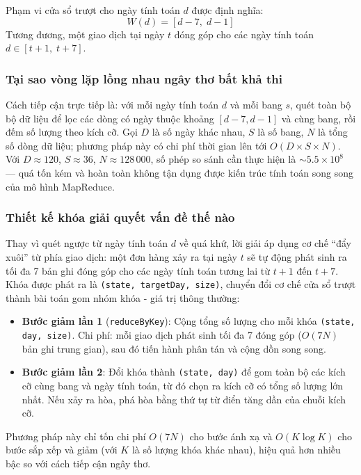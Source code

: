 Phạm vi cửa sổ trượt cho ngày tính toán $d$ được định nghĩa:
\[
W(d) = [d - 7,\; d - 1]
\]
Tương đương, một giao dịch tại ngày $t$ đóng góp cho các ngày tính toán $d \in [t+1,\; t+7]$.

\subsubsection{Tại sao vòng lặp lồng nhau ngây thơ bất khả thi}

Cách tiếp cận trực tiếp là: với mỗi ngày tính toán $d$ và mỗi bang $s$, quét toàn bộ bộ dữ liệu để lọc các dòng có ngày thuộc khoảng $[d-7, d-1]$ và cùng bang, rồi đếm số lượng theo kích cỡ. Gọi $D$ là số ngày khác nhau, $S$ là số bang, $N$ là tổng số dòng dữ liệu; phương pháp này có chi phí thời gian lên tới $O(D \times S \times N)$. Với $D \approx 120$, $S \approx 36$, $N \approx 128\,000$, số phép so sánh cần thực hiện là $\sim 5.5 \times 10^8$ --- quá tốn kém và hoàn toàn không tận dụng được kiến trúc tính toán song song của mô hình MapReduce.

\subsubsection{Thiết kế khóa giải quyết vấn đề thế nào}

Thay vì quét ngược từ ngày tính toán $d$ về quá khứ, lời giải áp dụng cơ chế ``đẩy xuôi'' từ phía giao dịch: một đơn hàng xảy ra tại ngày $t$ sẽ tự động phát sinh ra tối đa 7 bản ghi đóng góp cho các ngày tính toán tương lai từ $t+1$ đến $t+7$. Khóa được phát ra là \texttt{(state, targetDay, size)}, chuyển đổi cơ chế cửa sổ trượt thành bài toán gom nhóm khóa - giá trị thông thường:

\begin{itemize}
    \item \textbf{Bước giảm lần 1} (\texttt{reduceByKey}): Cộng tổng số lượng cho mỗi khóa \texttt{(state, day, size)}. Chi phí: mỗi giao dịch phát sinh tối đa 7 đóng góp ($O(7N)$ bản ghi trung gian), sau đó tiến hành phân tán và cộng dồn song song.
    \item \textbf{Bước giảm lần 2}: Đổi khóa thành \texttt{(state, day)} để gom toàn bộ các kích cỡ cùng bang và ngày tính toán, từ đó chọn ra kích cỡ có tổng số lượng lớn nhất. Nếu xảy ra hòa, phá hòa bằng thứ tự từ điển tăng dần của chuỗi kích cỡ.
\end{itemize}

Phương pháp này chỉ tốn chi phí $O(7N)$ cho bước ánh xạ và $O(K \log K)$ cho bước sắp xếp và giảm (với $K$ là số lượng khóa khác nhau), hiệu quả hơn nhiều bậc so với cách tiếp cận ngây thơ.

